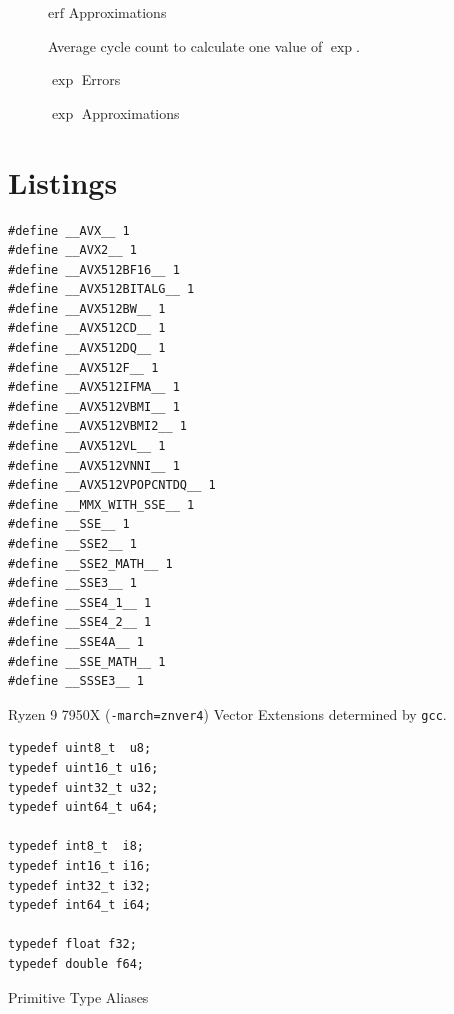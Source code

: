 \documentclass[a4paper, 11pt]{memoir}
\newcommand*{\erf}{\text{erf}}
\begin{document}
    \begin{figure}[ht]
        \centering
        
        \caption{$\erf$ Approximations}
        \label{fig:erf_approx}
    \end{figure}

    \begin{figure}[ht]
        \centering
        
        \caption{Average cycle count to calculate one value of $\exp$.}
        \label{fig:cycles_exp}
    \end{figure}

    \begin{figure}[ht]
        \centering
        
        \caption{$\exp$ Errors}
        \label{fig:exp_errors}
    \end{figure}
    
    \begin{figure}[ht]
        \centering
        
        \caption{$\exp$ Approximations}
        \label{fig:exp_approx}
    \end{figure}

    \chapter{Listings}
    \label{ch:listings}
    \begin{listing}[ht]
        \begin{verbatim}
#define __AVX__ 1
#define __AVX2__ 1
#define __AVX512BF16__ 1
#define __AVX512BITALG__ 1
#define __AVX512BW__ 1
#define __AVX512CD__ 1
#define __AVX512DQ__ 1
#define __AVX512F__ 1
#define __AVX512IFMA__ 1
#define __AVX512VBMI__ 1
#define __AVX512VBMI2__ 1
#define __AVX512VL__ 1
#define __AVX512VNNI__ 1
#define __AVX512VPOPCNTDQ__ 1
#define __MMX_WITH_SSE__ 1
#define __SSE__ 1
#define __SSE2__ 1
#define __SSE2_MATH__ 1
#define __SSE3__ 1
#define __SSE4_1__ 1
#define __SSE4_2__ 1
#define __SSE4A__ 1
#define __SSE_MATH__ 1
#define __SSSE3__ 1
        \end{verbatim}
        \caption{Ryzen 9 7950X (\texttt{-march=znver4}) Vector Extensions determined by \texttt{gcc}.}
        \label{lst:extensions}
    \end{listing}

    \begin{listing}[ht]
        \begin{verbatim}
typedef uint8_t  u8;
typedef uint16_t u16;
typedef uint32_t u32;
typedef uint64_t u64;

typedef int8_t  i8;
typedef int16_t i16;
typedef int32_t i32;
typedef int64_t i64;

typedef float f32;
typedef double f64;
        \end{verbatim}
        \caption{Primitive Type Aliases}
        \label{lst:type_aliases}
    \end{listing}
\end{document}
